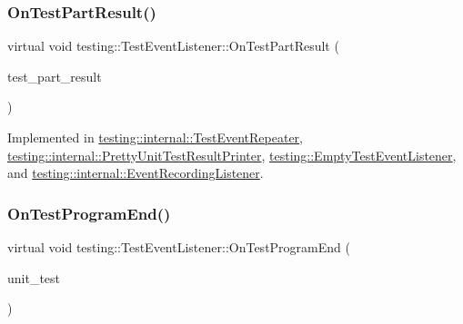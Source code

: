 \mbox{\label{classtesting_1_1_test_event_listener_a054f8705c883fa120b91473aff38f2ee}} 
\subsubsection{\texorpdfstring{On\+Test\+Part\+Result()}{OnTestPartResult()}}
{\footnotesize\ttfamily virtual void testing\+::\+Test\+Event\+Listener\+::\+On\+Test\+Part\+Result (\begin{DoxyParamCaption}\item[{const \hyperlink{classtesting_1_1_test_part_result}{Test\+Part\+Result} \&}]{test\+\_\+part\+\_\+result }\end{DoxyParamCaption})\hspace{0.3cm}{\ttfamily [pure virtual]}}



Implemented in \hyperlink{classtesting_1_1internal_1_1_test_event_repeater_ac8fb21da6802b1ebab9cad3eee9150eb}{testing\+::internal\+::\+Test\+Event\+Repeater}, \hyperlink{classtesting_1_1internal_1_1_pretty_unit_test_result_printer_a7589e8df7485349498a3a81bf16e2f68}{testing\+::internal\+::\+Pretty\+Unit\+Test\+Result\+Printer}, \hyperlink{classtesting_1_1_empty_test_event_listener_a59e7f7d9f2e2d089a6e8c1e2577f4718}{testing\+::\+Empty\+Test\+Event\+Listener}, and \hyperlink{classtesting_1_1internal_1_1_event_recording_listener_a4a6685d894923f1691ad9c6a4311470e}{testing\+::internal\+::\+Event\+Recording\+Listener}.

\mbox{\label{classtesting_1_1_test_event_listener_ad15b6246d94c268e233487a86463ef3d}} 
\subsubsection{\texorpdfstring{On\+Test\+Program\+End()}{OnTestProgramEnd()}}
{\footnotesize\ttfamily virtual void testing\+::\+Test\+Event\+Listener\+::\+On\+Test\+Program\+End (\begin{DoxyParamCaption}\item[{const \hyperlink{classtesting_1_1_unit_test}{Unit\+Test} \&}]{unit\+\_\+test }\end{DoxyParamCaption})\hspace{0.3cm}{\ttfamily [pure virtual]}}



